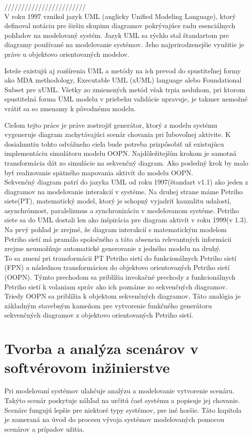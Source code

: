 ////////////////////////\\
V roku 1997 vznikol jazyk UML (anglicky Unified Modeling Language), ktorý definoval notáciu pre širšiu skupinu diagramov pokrývajúce radu esenciálnych pohľadov na modelovaný systém. Jazyk UML sa rýchlo stal štandartom pre diagramy používané na modelovanie systémov. Jeho najprirodzenejšie využitie je práve u objektovo orientovaných modelov.

 Isteže existujú aj rozšírenia UML a metódy na ich prevod do spustiteľnej formy ako MDA methodology, Executable UML (xUML) language alebo Foundational Subset pre xUML. Všetky zo zmienených metód však trpia neduhom, pri ktorom spustitelná forma UML modelu v priebehu validácie upravuje, je takmer nemožné vrátiť sa so zmenamy k pôvodnému modelu. 

Cieľom tejto práce je práve zostrojiť generátor, ktorý z modelu systému vygeneruje diagram zachytávajúci scenár chovania pri ľubovoľnej aktivite. K dosiahnutiu tohto odvážneho cieľa bude potreba prizpôsobiť už existujúcu implementáciu simulátoru modelu OOPN. Najdôležitejším  krokom je samotná transformácia dát zo simulácie na sekvenčný diagram. Ako posledný krok by malo byť realizovanie spätného mapovania aktivít do modelu OOPN. \\

Sekvenčný diagram patrí do jazyka UML od roku 1997(štandart v1.1) ako jeden z diagramov na modelovanie interakcií v systéme. Na druhej strane máme Petriho siete(PT), matematický model, ktorý je schopný vyjadriť kauzalitu udalostí, asynchrónnost, paralelizmus a synchronizáciu v modelovanom systéme. Petriho siete sa do UML dostali len ako inšpirácia pre diagram aktivít v roku 1999(v 1.3). Na prvý pohľad je zrejmé, že diagram interakcií s matematickým modelom Petriho sietí má pramálo spoločného a táto absencia relevantných informácii zrejme neumožňuje automatické generovanie z jedného modelu na druhý. \\

To sa zmení pri transformácii PT Petriho sietí do  funkcionálnych Petriho sietí (FPN) a následnou transformáciou do objektovo orientovaných Petriho sietí (OOPN). Týmto prechodom sa priblížia invokačné prechody z funkcionálnych Petriho sietí k volaniam správ ako ich poznáme zo sekvenčných diagramov. Triedy OOPN sa priblížia k objektom sekvenčných diagramov. Táto analógia je základným stavebným kameňom pre vytvorenie funkčného generátoru sekvenčných diagramov z objektovo orientovaných Petriho sietí.


\chapter{Tvorba a analýza scenárov v softvérovom inžinierstve}
Pri modelovaní systémov uľahčuje analýzu a modelovanie vytvorenie scenáru. Takýto scenár poskytuje náhľad na určitú časť systému a popisuje jej chovanie. Scenáre fungujú lepšie pre niektoré typy systémov, pre iné horšie. Táto kapitola je zameraná na úvod do procesu vývoja systémov modelovaných pomocou scenárov a prípadov užitia.


